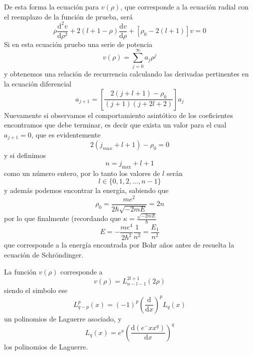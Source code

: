 De esta forma la ecuación para $v(\rho)$, que corresponde a la ecuación radial con el reemplazo de la función de prueba, será
\begin{equation}
    \rho \frac{\mathrm{d}^2 v}{\mathrm{d}\rho^2} + 2(l + 1 - \rho) \frac{\mathrm{d} v}{\mathrm{d}\rho} + [\rho_0 - 2(l + 1)] v = 0
\end{equation}
Si en esta ecuación pruebo una serie de potencia
\begin{equation}
    v(\rho) = \sum_{j = 0}^\infty a_j \rho^j
\end{equation}
y obtenemos una relación de recurrencia calculando las derivadas pertinentes en la ecuación diferencial
\begin{equation}
    a_{j + 1} = \left[ \frac{ 2(j + l + 1) - \rho_0}{(j + 1) (j + 2l + 2)}\right] a_j
\end{equation}
Nuevamente si observamos el comportamiento asintótico de los coeficientes encontramos que debe terminar, es decir que exista un valor para el cual $a_{j + 1} = 0$, que es evidentemente
\begin{equation}
    2 (j_{max} + l + 1) - \rho_0 = 0
\end{equation}
y si definimos 
\begin{equation}
    n = j_{\max} + l + 1
\end{equation}
como un número entero, por lo tanto los valores de $l$ serán
\begin{equation}
    l \in \{0, 1, 2, \dots, n - 1\}
\end{equation}
y además podemos encontrar la energía, sabiendo que 
\[ \rho_0 = \frac{m e^2}{2 \hbar \sqrt{-2 m E}} = 2n\]
por lo que finalmente (recordando que $\kappa = \frac{\sqrt{-2 m E}}{\hbar}$
\begin{equation}
    E = - \frac{m e^4}{2 \hbar^2} \frac{1}{n^2} = \frac{E_1}{n^2}
\end{equation}
que corresponde a la energía encontrada por Bohr años antes de resuelta la ecuación de Schröndinger.

La función $v(\rho)$ corresponde a 
\begin{equation}
    v(\rho) = L^{2l + 1}_{n - l -1}(2\rho)
\end{equation}
siendo el simbolo ese
\begin{equation}
    L^{p}_{q - p}(x) = (-1)^p \left(\frac{\mathrm{d}}{\mathrm{d}x}\right)^p L_q(x)
\end{equation}
un polinomios de Laguerre asociado, y
\begin{equation}
    L_q(x) = e^x \left(\frac{\mathrm{d} (e^-x x^q)}{\mathrm{d}x}\right)^q
\end{equation}
los polinomios de Laguerre.

